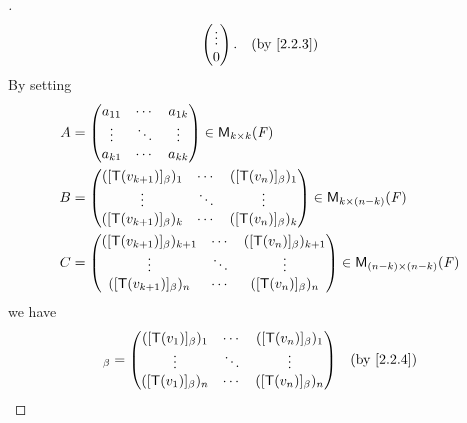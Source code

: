 \begin{proof}[]
\begin{align*}
\begin{pmatrix}
			                                                                                                             \vdots  \\
			                                                                                                             0
		                                                                                                             \end{pmatrix}. &  & \by{2.2.3}
	\end{align*}
	By setting
	\begin{align*}
		A & = \begin{pmatrix}
			      a_{1 1} & \cdots & a_{1 k} \\
			      \vdots  & \ddots & \vdots  \\
			      a_{k 1} & \cdots & a_{k k}
		      \end{pmatrix} \in \mathsf{M}_{{k} \times k}({\mathit{F}})                                                                    \\
		B & = \begin{pmatrix}
			      ([\mathsf{T}(v_{k + 1})]_{\beta})_1 & \cdots & ([\mathsf{T}(v_n)]_{\beta})_1 \\
			      \vdots                      & \ddots & \vdots                \\
			      ([\mathsf{T}(v_{k + 1})]_{\beta})_k & \cdots & ([\mathsf{T}(v_n)]_{\beta})_k
		      \end{pmatrix} \in \mathsf{M}_{{k} \times (n - k)}({\mathit{F}})             \\
		C & = \begin{pmatrix}
			      ([\mathsf{T}(v_{k + 1})]_{\beta})_{k + 1} & \cdots & ([\mathsf{T}(v_n)]_{\beta})_{k + 1} \\
			      \vdots                            & \ddots & \vdots                      \\
			      ([\mathsf{T}(v_{k + 1})]_{\beta})_n       & \cdots & ([\mathsf{T}(v_n)]_{\beta})_n
		      \end{pmatrix} \in \mathsf{M}_{{(n - k)} \times (n - k)}({\mathit{F}})
	\end{align*}
	we have
	\begin{align*}
		[\T]_{\beta} & = \begin{pmatrix}
			                 ([\T(v_1)]_{\beta})_1 & \cdots & ([\T(v_n)]_{\beta})_1   \\
			                 \vdots                & \ddots & \vdots                  \\
			                 ([\T(v_1)]_{\beta})_n & \cdots & ([\T(v_n)]_{\beta})_{n}
		                 \end{pmatrix}                                        &  & \by{2.2.4}                                        \\

\end{align*}
\end{proof}

